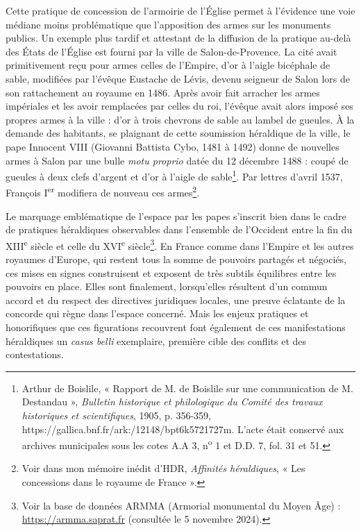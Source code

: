 \documentclass[12pt,twoside,openany]{book}
\begin{document}
Cette pratique de concession de l’armoirie de l’Église permet à l’évidence une voie médiane moins problématique que l’apposition des armes sur les monuments publics. Un exemple plus tardif et attestant de la diffusion de la pratique au-delà des États de l’Église est fourni par la ville de Salon-de-Provence. La cité avait primitivement reçu pour armes celles de l’Empire, d’or à l’aigle bicéphale de sable, modifiées par l’évêque Eustache de Lévis, devenu seigneur de Salon lors de son rattachement au royaume en 1486. Après avoir fait arracher les armes impériales et les avoir remplacées par celles du roi, l’évêque avait alors imposé ses propres armes à la ville : d’or à trois chevrons de sable au lambel de gueules. À la demande des habitants, se plaignant de cette soumission héraldique de la ville, le pape Innocent VIII (Giovanni Battista Cybo, 1481 à 1492) donne de nouvelles armes à Salon par une bulle \textit{motu proprio} datée du 12 décembre 1488 : coupé de gueules à deux clefs d’argent et d’or à l’aigle de sable\footnote{Arthur de Boislile, « Rapport de M. de Boislile sur une communication de M. Destandau », \textit{Bulletin historique et philologique du Comité des travaux historiques et scientifiques}, 1905, p. 356-359, https://gallica.bnf.fr/ark:/12148/bpt6k5721727m. L’acte était conservé aux archives municipales sous les cotes A.A 3, n\textsuperscript{o} 1 et D.D. 7, fol. 31 et 51.}. Par lettres d’avril 1537, François I\textsuperscript{er} modifiera de nouveau ces armes\footnote{Voir dans mon mémoire inédit d’HDR, \textit{Affinités héraldiques}, « Les concessions dans le royaume de France ».}.

Le marquage emblématique de l’espace par les papes s’inscrit bien dans le cadre de pratiques héraldiques observables dans l’ensemble de l’Occident entre la fin du XIII\textsuperscript{e} siècle et celle du XVI\textsuperscript{e} siècle\footnote{Voir la base de données ARMMA (Armorial monumental du Moyen Âge) : \href{https://armma.saprat.fr}{https://armma.saprat.fr} (consultée le 5 novembre 2024).}. En France comme dans l’Empire et les autres royaumes d’Europe, qui restent tous la somme de pouvoirs partagés et négociés, ces mises en signes construisent et exposent de très subtils équilibres entre les pouvoirs en place. Elles sont finalement, lorsqu’elles résultent d’un commun accord et du respect des directives juridiques locales, une preuve éclatante de la concorde qui règne dans l’espace concerné. Mais les enjeux pratiques et honorifiques que ces figurations recouvrent font également de ces manifestations héraldiques un \textit{casus belli} exemplaire, première cible des conflits et des contestations.
\end{document}
